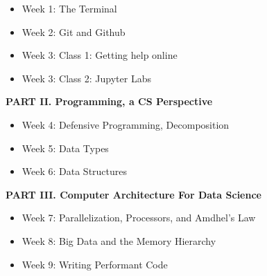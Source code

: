 \documentclass[12pt]{article}
\begin{document}
\begin{itemize}
	\item Week 1: The Terminal
	\item Week 2: Git and Github
	\item Week 3: Class 1: Getting help online
	\item Week 3: Class 2: Jupyter Labs
\end{itemize}

\vspace{.4in}
\begin{center}
	\textbf{PART II. Programming, a CS Perspective}
\end{center}
\vspace{.2in}

\begin{itemize}
	\item Week 4: Defensive Programming, Decomposition
	\item Week 5: Data Types
	\item Week 6: Data Structures
\end{itemize}

\vspace{.4in}
\begin{center}
	\textbf{PART III. Computer Architecture For Data Science}
\end{center}
\vspace{.2in}

\begin{itemize}
	\item Week 7: Parallelization, Processors, and Amdhel's Law
	\item Week 8: Big Data and the Memory Hierarchy
	\item Week 9: Writing Performant Code
\end{itemize}
\end{document}
